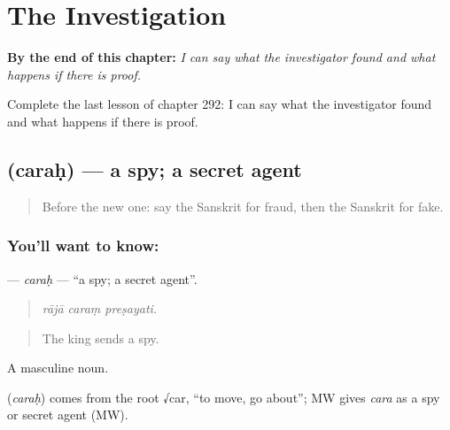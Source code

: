 
\chapter{The Investigation}
\label{ch:sa-the-investigation}

\begin{chapteropening}
\textbf{By the end of this chapter:} \emph{I can say what the investigator found and what happens if there is proof.}

Complete the last lesson of chapter 292: I can say what the investigator found and what happens if there is proof.
\end{chapteropening}

\section[\texorpdfstring{\sk{चरः} (caraḥ)}{चरः (caraḥ)}]{ (caraḥ) — a spy; a secret agent}

\label{lesson:SA-C292-carah}



\begin{quote}
Before the new one: say the Sanskrit for fraud, then the Sanskrit for fake.
\end{quote}

\subsection*{You'll want to know: }
\textbf{} — \emph{caraḥ} — \textquotedblleft{}a spy; a secret agent\textquotedblright{}.

\begin{quote}
  
\end{quote}

\begin{quote}
\emph{rājā caraṃ preṣayati.}
\end{quote}

\begin{quote}
The king sends a spy.
\end{quote}

A masculine noun.

\begin{cousinweb}
\textbf{} (\emph{caraḥ}) comes from the root √car, \textquotedblleft{}to move, go about\textquotedblright{}; MW gives \emph{cara} as a spy or secret agent (MW).
\end{cousinweb}

